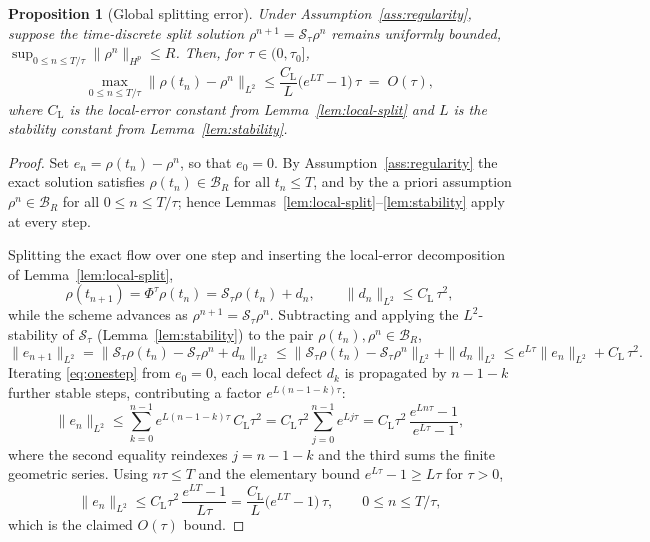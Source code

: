 \documentclass[12pt]{article}
\newtheorem{proposition}{Proposition}[section]
\begin{document}
\begin{proposition}[Global splitting error]\label{prop:global-split}
Under Assumption~\ref{ass:regularity}, suppose the time-discrete split solution
$\rho^{n+1}=\mathcal S_{\tau}\rho^{n}$ remains uniformly bounded,
$\sup_{0\le n\le T/\tau}\|\rho^{n}\|_{H^{p}}\le R$. Then, for $\tau\in(0,\tau_0]$,
\[
\max_{0\le n\le T/\tau}\big\|\rho(t_{n})-\rho^{n}\big\|_{L^{2}}
\le \frac{C_{\mathrm L}}{L}\big(e^{LT}-1\big)\,\tau \;=\;O(\tau),
\]
where $C_{\mathrm L}$ is the local-error constant from
Lemma~\ref{lem:local-split} and $L$ is the stability constant from
Lemma~\ref{lem:stability}.
\end{proposition}
\begin{proof}
Set $e_{n}=\rho(t_{n})-\rho^{n}$, so that $e_{0}=0$. By
Assumption~\ref{ass:regularity} the exact solution satisfies
$\rho(t_n)\in\mathcal B_{R}$ for all $t_n\le T$, and by the a priori assumption
$\rho^{n}\in\mathcal B_{R}$ for all $0\le n\le T/\tau$; hence
Lemmas~\ref{lem:local-split}--\ref{lem:stability} apply at every step.

Splitting the exact flow over one step and inserting the local-error
decomposition of Lemma~\ref{lem:local-split},
\[
\rho(t_{n+1})=\Phi^{\tau}\rho(t_{n})
=\mathcal S_{\tau}\rho(t_{n})+d_{n},
\qquad \|d_{n}\|_{L^{2}}\le C_{\mathrm L}\,\tau^{2},
\]
while the scheme advances as $\rho^{n+1}=\mathcal S_{\tau}\rho^{n}$. Subtracting
and applying the $L^{2}$-stability of $\mathcal S_{\tau}$
(Lemma~\ref{lem:stability}) to the pair $\rho(t_n),\rho^{n}\in\mathcal B_{R}$,
\begin{equation}
\|e_{n+1}\|_{L^{2}}
=\big\|\mathcal S_{\tau}\rho(t_n)-\mathcal S_{\tau}\rho^{n}+d_n\big\|_{L^{2}}
\le \|\mathcal S_{\tau}\rho(t_n)-\mathcal S_{\tau}\rho^{n}\|_{L^{2}}+\|d_n\|_{L^{2}}
\le e^{L\tau}\|e_{n}\|_{L^{2}}+C_{\mathrm L}\,\tau^{2}.
\label{eq:onestep}
\end{equation}
Iterating \eqref{eq:onestep} from $e_{0}=0$, each local
defect $d_{k}$ is propagated by $n-1-k$ further stable steps, contributing a
factor $e^{L(n-1-k)\tau}$:
\[
\|e_{n}\|_{L^{2}}
\le \sum_{k=0}^{n-1} e^{L(n-1-k)\tau}\,C_{\mathrm L}\tau^{2}
= C_{\mathrm L}\tau^{2}\sum_{j=0}^{n-1} e^{Lj\tau}
= C_{\mathrm L}\tau^{2}\,\frac{e^{Ln\tau}-1}{e^{L\tau}-1},
\]
where the second equality reindexes $j=n-1-k$ and the third sums the finite
geometric series. Using $n\tau\le T$ and the elementary bound
$e^{L\tau}-1\ge L\tau$ for $\tau>0$,
\[
\|e_{n}\|_{L^{2}}
\le C_{\mathrm L}\tau^{2}\,\frac{e^{LT}-1}{L\tau}
= \frac{C_{\mathrm L}}{L}\big(e^{LT}-1\big)\,\tau,
\qquad 0\le n\le T/\tau,
\]
which is the claimed $O(\tau)$ bound.
\end{proof}
\end{document}
